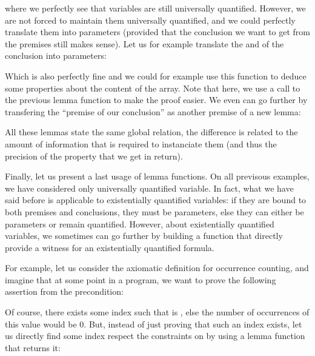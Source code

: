 


where we perfectly see that variables are still universally quantified. However,
we are not forced to maintain them universally quantified, and we could
perfectly translate them into parameters (provided that the conclusion we want
to get from the premises still makes sense). Let us for example translate the
 and  of the conclusion into parameters:






Which is also perfectly fine and we could for example use this function to
deduce some properties about the content of the array. Note that here, we use a
call to the previous lemma function to make the proof easier. We even can go
further by transfering the ``premise of our conclusion'' as another premise of
a new lemma:






All these lemmas state the same global relation, the difference is related to
the amount of information that is required to instanciate them (and thus the
precision of the property that we get in return).



Finally, let us present a last usage of lemma functions. On all previsous
examples, we have considered only universally quantified variable. In fact, what
we have said before is applicable to existentially quantified variables: if they
are bound to both premises and conclusions, they must be parameters, else they
can either be parameters or remain quantified. However, about existentially
quantified variables, we sometimes can go further by building a function that
directly provide a witness for an existentially quantified formula.



For example, let us consider the axiomatic definition for occurrence counting,
and imagine that at some point in a program, we want to prove the following
assertion from the precondition:






Of course, there exists some index  such that 
is , else the number of occurrences of this value would be $0$.
But, instead of just proving that such an index exists, let us directly find
some index respect the constraints on  by using a lemma function
that returns it:



